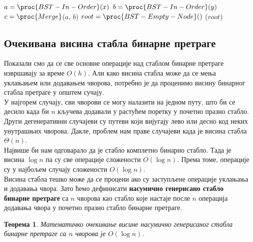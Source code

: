 \documentclass[11pt, a4paper]{article}
\newtheorem{teorema}{\selectlanguage{russian} Теорема}[subsection]
\theoremstyle{remark}
\numberwithin{equation}{section}
\begin{document}
	\begin{codebox}
		\li $a=\proc{BST-In-Order}(x)$
		\li $b=\proc{BST-In-Order}(y)$
		\li $c=\proc{Merge}$($a$, $b$) 
		\li $root=\proc{BST-Empty-Node}()$
		\li \Return {}($root$)
	\end{codebox}
	
	\subsection{Очекивана висина стабла бинарне претраге}
	Показали смо да се све основне операције над стаблом бинарне претраге извршавају за време $O(h)$. Али како висина стабла може да се мења уклањањем или додавањем чворова, потребно је да проценимо висину бинарног стабла претраге у општем сучају. \\
	\indent У најгорем случају, сви чворови се могу налазити на једном путу, што би се десило када би $n$ кључева додавали у растућем поретку у почетно празно стабло. Други дегенеративни случајеви су путеви који вијугају лево или десно код неких унутрашњих чворова. Дакле, проблем нам праве случајеви када је висина стабла $\Theta (n)$. \\
	\indent Највише би нам одговарало да је стабло комплетно бинарно стабло. Тада је висина $\log n$ па су све операције сложености $O(\log n)$. Према томе, операције су у најбољем случају сложености $O(\log n)$. \\
	\indent Висина стабла тешко може да се процени ако су заступљене операције уклањања и додавања чвора. Зато ћемо дефинисати \textbf{насумично генерисано стабло бинарне претраге} са $n$ чворова као стабло које настаје после $n$ операција додавања чвора у почетно празно стабло бинарне претраге.
	
	\begin{teorema}
		\normalfont
		Математичко очекивање висине насумично генерисаног стабла бинарне претраге са $n$ чворова је $O(\log n)$.
	\end{teorema}
\end{document}

